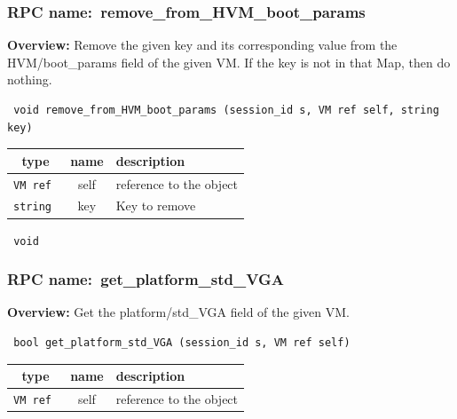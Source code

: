\vspace{0.3cm}
\vspace{0.3cm}
\vspace{0.3cm}
\subsubsection{RPC name:~remove\_from\_HVM\_boot\_params}

{\bf Overview:} 
Remove the given key and its corresponding value from the HVM/boot\_params
field of the given VM.  If the key is not in that Map, then do nothing.

\begin{verbatim} void remove_from_HVM_boot_params (session_id s, VM ref self, string key)\end{verbatim}



 
\vspace{0.3cm}
\begin{tabular}{|c|c|p{7cm}|}
 \hline
{\bf type} & {\bf name} & {\bf description} \\ \hline
{\tt VM ref } & self & reference to the object \\ \hline 

{\tt string } & key & Key to remove \\ \hline 

\end{tabular}

\vspace{0.3cm}

{\tt 
void
}



\vspace{0.3cm}
\vspace{0.3cm}
\vspace{0.3cm}
\subsubsection{RPC name:~get\_platform\_std\_VGA}

{\bf Overview:} 
Get the platform/std\_VGA field of the given VM.

\begin{verbatim} bool get_platform_std_VGA (session_id s, VM ref self)\end{verbatim}



 
\vspace{0.3cm}
\begin{tabular}{|c|c|p{7cm}|}
 \hline
{\bf type} & {\bf name} & {\bf description} \\ \hline
{\tt VM ref } & self & reference to the object \\ \hline 

\end{tabular}

